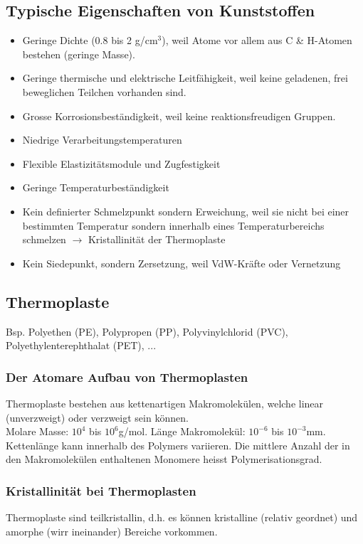 \subsection{Typische Eigenschaften von Kunststoffen}
\begin{itemize}
	\item Geringe Dichte (0.8 bis 2 g/cm$^3$), weil Atome vor allem aus C \& H-Atomen bestehen (geringe Masse).
	\item Geringe thermische und elektrische Leitfähigkeit, weil keine geladenen, frei beweglichen Teilchen vorhanden sind.
	\item Grosse Korrosionsbeständigkeit, weil keine reaktionsfreudigen Gruppen.
	\item Niedrige Verarbeitungstemperaturen
	\item Flexible Elastizitätsmodule und Zugfestigkeit
	\item Geringe Temperaturbeständigkeit
	\item Kein definierter Schmelzpunkt sondern Erweichung, weil sie nicht bei einer bestimmten Temperatur sondern innerhalb eines Temperaturbereichs schmelzen $\rightarrow$ Kristallinität der Thermoplaste
	\item Kein Siedepunkt, sondern Zersetzung, weil VdW-Kräfte oder Vernetzung
\end{itemize}

\subsection{Thermoplaste}
Bsp. Polyethen (PE), Polypropen (PP), Polyvinylchlorid (PVC), Polyethylenterephthalat (PET), ... 

\subsubsection{Der Atomare Aufbau von Thermoplasten}
Thermoplaste bestehen aus kettenartigen Makromolekülen, welche linear (unverzweigt) oder verzweigt sein können.\\Molare Masse: $10^4$ bis $10^6$g/mol. Länge Makromolekül: $10^{-6}$ bis $10^{-3}$mm. Kettenlänge kann innerhalb des Polymers variieren. Die mittlere Anzahl der in den Makromolekülen enthaltenen Monomere heisst Polymerisationsgrad.

\subsubsection{Kristallinität bei Thermoplasten}
Thermoplaste sind teilkristallin, d.h. es können kristalline (relativ geordnet) und amorphe (wirr ineinander) Bereiche vorkommen.


